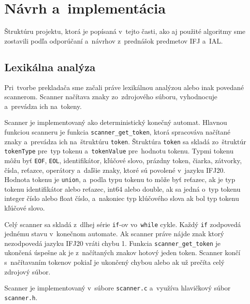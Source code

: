 \documentclass[a4paper, 12pt]{article}[25.11.2020]
\begin{document}
\newpage
\section{Návrh a~implementácia}
    \par Štruktúru projektu, ktorá je popísaná v~tejto časti, ako aj použité algoritmy
    sme zostavili podľa odporúčaní a~návrhov z~prednášok predmetov IFJ a~IAL.
    \subsection{Lexikálna analýza}
        \par Pri~tvorbe prekladača sme začali práve lexikálnou analýzou alebo inak
        povedané scannerom. Scanner načítava znaky zo~zdrojového súboru, vyhodnocuje 
        a~prevádza ich na~tokeny.
        \par Scanner je implementovaný ako deterministický konečný automat. Hlavnou
        funkciou scanneru je funkcia \verb|scanner_get_token|, ktorá spracováva
        načítané znaky a~prevádza ich na~štruktúru \verb|token|. Štruktúra
        \verb|token| sa skladá zo~štruktúr \verb|tokenType| pre~typ tokenu a~\verb|tokenValue|
        pre~hodnotu tokenu. Typmi tokenu môžu byť \verb|EOF|, \verb|EOL|, identifikátor,
        kľúčové slovo, prázdny token, čiarka, zátvorky, čísla, reťazce, operátory a~daľšie
        znaky, ktoré sú povolené v~jazyku IFJ20. Hodnota tokenu je \verb|union|, a~podla typu
        tokenu to môže byť reťazec, ak je typ tokenu identifikátor alebo reťazec, int64 alebo
        double, ak sa jedná o~typ tokenu integer číslo alebo float číslo, a~nakoniec typ
        klúčového slova ak bol typ tokenu kľúčové slovo. 
        \par Celý scanner sa skladá z~dlhej série \verb|if|-ov vo~\verb|while| cykle.
        Každý \verb|if| zodpovedá jednému stavu v~konečnom automate. Ak scanner práve
        nájde znak ktorý nezodpovedá jazyku IFJ20 vráti chybu 1. Funkcia
        \verb|scanner_get_token| je ukončená úspešne ak je z~načítaných znakov hotový
        jeden token. Scanner končí s~načítavaním tokenov pokiaľ je ukončený chybou
        alebo ak už prečíta celý zdrojový súbor.
        \par Scanner je implementovaný v~súbore \verb|scanner.c| a~využíva hlavičkový súbor
        \verb|scanner.h|.
\end{document}
